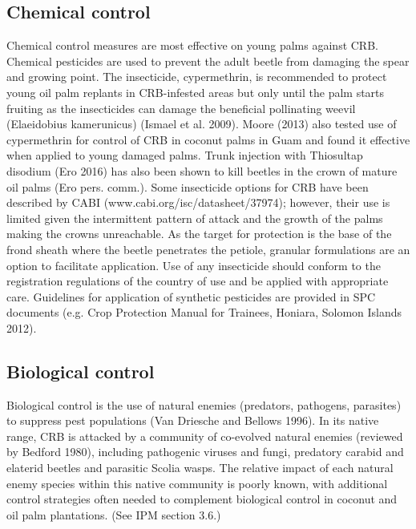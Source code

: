 \documentclass[twocolumn,letterpaper]{scrartcl}
\begin{document}
\subsection{Chemical control}
Chemical  control  measures  are  most  effective  on  young  palms  against  CRB.  Chemical  pesticides  are  used to  prevent  the  adult  beetle  from  damaging  the  spear  and  growing  point.  The  insecticide,  cypermethrin,  is recommended to protect young oil palm replants in CRB-infested areas but only until the palm starts fruiting as the insecticides can damage the beneficial pollinating weevil (Elaeidobius kamerunicus) (Ismael et al. 2009). 
Moore (2013) also tested use of cypermethrin for control of CRB in coconut palms in Guam and found it effective when applied to young damaged palms. Trunk injection with Thiosultap disodium (Ero 2016) has also been shown to kill beetles in the crown of mature oil palms (Ero pers. comm.). Some insecticide options for CRB have been described by CABI (www.cabi.org/isc/datasheet/37974); however, their use is limited given the intermittent pattern of attack and the growth of the palms making the crowns unreachable. As the target for protection is the base of the frond sheath where the beetle penetrates the petiole, granular formulations are an option to facilitate application. Use of any insecticide should conform to the registration regulations of the country of use and be applied with appropriate care. Guidelines for application of synthetic pesticides are provided in SPC documents (e.g. Crop Protection Manual for Trainees, Honiara, Solomon Islands 2012).

\subsection{Biological control}

Biological control is the use of natural enemies (predators, pathogens, parasites) to suppress pest populations 
(Van Driesche and Bellows 1996). In its native range, CRB is attacked by a community of co-evolved natural 
enemies (reviewed by Bedford 1980), including pathogenic viruses and fungi, predatory carabid and elaterid 
beetles  and  parasitic  Scolia  wasps.  The  relative  impact  of  each  natural  enemy  species  within  this  native 
community is poorly known, with additional control strategies often needed to complement biological control 
in coconut and oil palm plantations. (See IPM section 3.6.)
\end{document}
